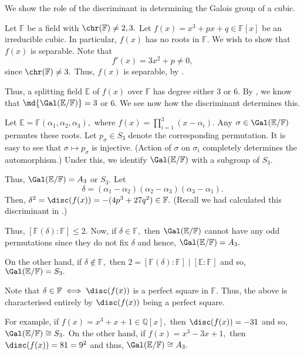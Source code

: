 \begin{ex}
    We show the role of the discriminant in determining the Galois group of a cubic.

    Let $\mathbb{F}$ be a field with $\chr(\mathbb{F}) \neq 2, 3.$ Let $f(x) = x^3 + px + q \in \mathbb{F}[x]$ be an irreducible cubic. In particular, $f(x)$ has no roots in $\mathbb{F}.$ We wish to show that $f(x)$ is separable. Note that
    \begin{equation*} 
        f'(x) = 3x^2 + p \neq 0,
    \end{equation*}
    since $\chr(\mathbb{F}) \neq 3.$ Thus, $f(x)$ is separable, by .

    Thus, a splitting field $\mathbb{E}$ of $f(x)$ over $\mathbb{F}$ has degree either $3$ or $6.$ By , we know that $\md{\Gal(\mathbb{E}/\mathbb{F})} = 3$ or $6.$ We see now how the discriminant determines this. 

    Let $\mathbb{E} = \mathbb{F}(\alpha_1, \alpha_2, \alpha_3),$ where $f(x) = \prod_{i = 1}^3 (x - \alpha_i).$ Any $\sigma \in \Gal(\mathbb{E}/\mathbb{F})$ permutes these roots. Let $p_\sigma \in S_3$ denote the corresponding permutation. It is easy to see that $\sigma \mapsto p_\sigma$ is injective. (Action of $\sigma$ on $\sigma_i$ completely determines the automorphism.) Under this, we identify $\Gal(\mathbb{E}/\mathbb{F})$ with a subgroup of $S_3.$

    Thus, $\Gal(\mathbb{E}/\mathbb{F}) = A_3$ or $S_3.$ Let
    \begin{equation*} 
        \delta = (\alpha_1 - \alpha_2)(\alpha_2 - \alpha_3)(\alpha_3 - \alpha_1).
    \end{equation*}
    Then, $\delta^2 = \disc(f(x)) = -(4p^3 + 27q^2) \in \mathbb{F}.$ (Recall we had calculated this discriminant in .)

    Thus, $[\mathbb{F}(\delta) : \mathbb{F}] \le 2.$ Now, if $\delta \in \mathbb{F},$ then $\Gal(\mathbb{E}/\mathbb{F})$ cannot have any odd permutations since they do not fix $\delta$ and hence, $\Gal(\mathbb{E}/\mathbb{F}) = A_3.$

    On the other hand, if $\delta \notin \mathbb{F},$ then $2 = [\mathbb{F}(\delta) : \mathbb{F}] \mid [\mathbb{E} : \mathbb{F}]$ and so, $\Gal(\mathbb{E}/\mathbb{F}) = S_3.$

    Note that $\delta \in \mathbb{F} \iff \disc(f(x))$ is a perfect square in $\mathbb{F}.$ Thus, the above is characterised entirely by $\disc(f(x))$ being a perfect square.

    For example, if $f(x) = x^3 + x + 1 \in \mathbb{Q}[x],$ then $\disc(f(x)) = -31$ and so, $\Gal(\mathbb{E}/\mathbb{F}) \cong S_3.$ On the other hand, if $f(x) = x^3 - 3x + 1,$ then $\disc(f(x)) = 81 = 9^2$ and thus, $\Gal(\mathbb{E}/\mathbb{F}) \cong A_3.$
\end{ex}

